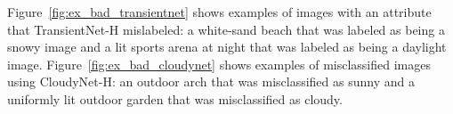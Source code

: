 \documentclass[10pt,twocolumn,letterpaper]{article}
\newcommand{\todo}[1]{\textcolor{red}{todo: {\em #1}}}
\newcommand{\figref}[1]{Figure~\ref{fig:#1}}
\begin{document}
\figref{ex_bad_transientnet} shows examples of images with an attribute that
TransientNet-H mislabeled:  a white-sand beach that was labeled as being a
snowy image and a lit sports arena at night that was labeled as being a
daylight image.  \figref{ex_bad_cloudynet} shows examples of misclassified
images using CloudyNet-H:  an outdoor arch that was misclassified as sunny and
a uniformly lit outdoor garden that was misclassified as cloudy.



%

\end{document}
